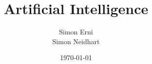 \titlehead{Hochschule Luzern \\ 
	Technik \& Architektur}
\subject{Zusammenfassung}
\title{Artificial Intelligence}
\subtitle{}
\author{Simon Erni\\Simon Neidhart}
\date{\today}

\maketitle